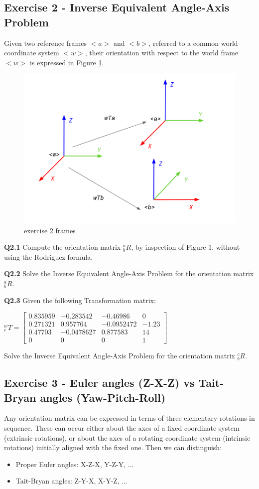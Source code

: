 \subsection{Exercise 2 - Inverse Equivalent Angle-Axis Problem}
Given two reference frames $<a>$ and $<b>$, referred to a common world coordinate system $<w>$, their orientation with respect to the world frame $<w>$ is expressed in Figure \ref{fig:ex2}.
\newline

\begin{figure}
\centering
\includegraphics[width=0.6\linewidth]{Resources/reference_frames_ex2.png}
\caption{exercise 2 frames}
\label{fig:ex2}
\end{figure}

\textbf{Q2.1} Compute the orientation matrix $^a_b R$, by inspection of Figure 1, without using the Rodriguez formula. 

\textbf{Q2.2} Solve the Inverse Equivalent Angle-Axis Problem for the orientation matrix $^a_b R$.

\textbf{Q2.3} Given the following Transformation matrix:

 $^w_c T =\begin{bmatrix}
0.835959 & -0.283542 & -0.46986 & 0\\
    0.271321 & 0.957764 & -0.0952472 & -1.23\\
    0.47703 & -0.0478627 & 0.877583 & 14\\
    0 & 0 & 0 & 1
\end{bmatrix}$

Solve the Inverse Equivalent Angle-Axis Problem for the orientation matrix $^c_b R$.

\newpage
\subsection{Exercise 3 - Euler angles (Z-X-Z) vs Tait-Bryan angles (Yaw-Pitch-Roll)}
Any orientation matrix can be expressed in terms of three elementary rotations in sequence. These can occur either about the axes of a fixed coordinate system (extrinsic rotations), or about the axes of a rotating coordinate system (intrinsic rotations) initially aligned with the fixed one. Then we can distinguish:
\begin{itemize}
    \item Proper Euler angles: X-Z-X, Y-Z-Y, ...
    \item Tait-Bryan angles: Z-Y-X, X-Y-Z, ...
\end{itemize}

